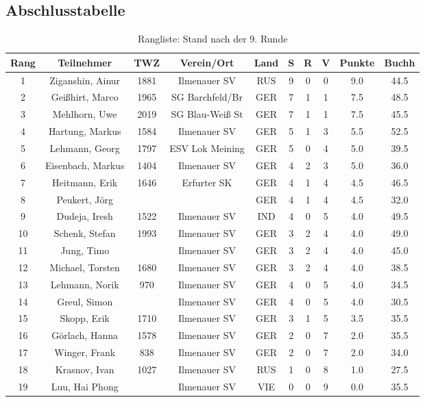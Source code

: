 \documentclass[a4paper,ngerman]{tui-algo-seminar}
\begin{document}
\clearpage


\subsection{Abschlusstabelle}
\begin{table}[H]
\centering
\caption{Rangliste: Stand nach der 9. Runde}
\begin{tabular}{cccccccccc}
\toprule
\textbf{Rang} & \textbf{Teilnehmer} & \textbf{TWZ} & \textbf{Verein/Ort} & \textbf{Land} & \textbf{S} & \textbf{R} & \textbf{V} & \textbf{Punkte} & \textbf{Buchh} \\
\midrule
1  & Ziganshin, Ainur     & 1881 & Ilmenauer SV      & RUS & 9 & 0 & 0 & 9.0 & 44.5  \\
2  & Geißhirt, Marco      & 1965 & SG Barchfeld/Br   & GER & 7 & 1 & 1 & 7.5 & 48.5  \\
3  & Mehlhorn, Uwe        & 2019 & SG Blau-Weiß St   & GER & 7 & 1 & 1 & 7.5 & 45.5  \\
4  & Hartung, Markus      & 1584 & Ilmenauer SV      & GER & 5 & 1 & 3 & 5.5 & 52.5  \\
5  & Lehmann, Georg       & 1797 & ESV Lok Meining   & GER & 5 & 0 & 4 & 5.0 & 39.5  \\
6  & Eisenbach, Markus    & 1404 & Ilmenauer SV      & GER & 4 & 2 & 3 & 5.0 & 36.0  \\
7  & Heitmann, Erik       & 1646 & Erfurter SK       & GER & 4 & 1 & 4 & 4.5 & 46.5  \\
8  & Peukert, Jörg        &      &                   & GER & 4 & 1 & 4 & 4.5 & 32.0  \\
9  & Dudeja, Iresh        & 1522 & Ilmenauer SV      & IND & 4 & 0 & 5 & 4.0 & 49.5  \\
10 & Schenk, Stefan       & 1993 & Ilmenauer SV      & GER & 3 & 2 & 4 & 4.0 & 49.0  \\
11 & Jung, Timo           &      & Ilmenauer SV      & GER & 3 & 2 & 4 & 4.0 & 45.0  \\
12 & Michael, Torsten     & 1680 & Ilmenauer SV      & GER & 3 & 2 & 4 & 4.0 & 38.5  \\
13 & Lehmann, Norik       & 970  & Ilmenauer SV      & GER & 4 & 0 & 5 & 4.0 & 34.5  \\
14 & Greul, Simon         &      & Ilmenauer SV      & GER & 4 & 0 & 5 & 4.0 & 30.5  \\
15 & Skopp, Erik          & 1710 & Ilmenauer SV      & GER & 3 & 1 & 5 & 3.5 & 35.5  \\
16 & Görlach, Hanna       & 1578 & Ilmenauer SV      & GER & 2 & 0 & 7 & 2.0 & 35.5  \\
17 & Winger, Frank        & 838  & Ilmenauer SV      & GER & 2 & 0 & 7 & 2.0 & 34.0  \\
18 & Krasnov, Ivan        & 1027 & Ilmenauer SV      & RUS & 1 & 0 & 8 & 1.0 & 27.5  \\
19 & Luu, Hai Phong       &      & Ilmenauer SV      & VIE & 0 & 0 & 9 & 0.0 & 35.5  \\
\bottomrule
\end{tabular}
\end{table}
\end{document}
